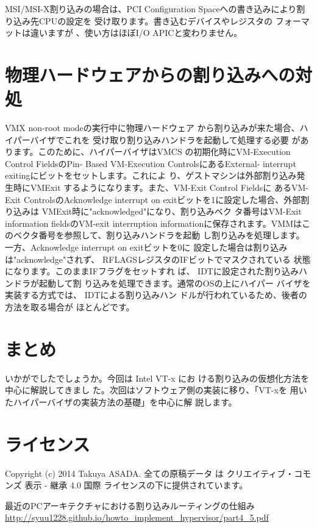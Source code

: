  MSI/MSI-X割り込みの場合は、PCI Configuration
Spaceへの書き込みにより割り込み先CPUの設定を
受け取ります。書き込むデバイスやレジスタの
フォーマットは違いますが 、使い方はほぼI/O
APICと変わりません\cite{interrupt-routing}。

\section{物理ハードウェアからの割り込みへの対処}

 VMX non-root modeの実行中に物理ハードウェア
から割り込みが来た場合、ハイパーバイザでこれを
受け取り割り込みハンドラを起動して処理する必要
があります。このために、ハイパーバイザはVMCS
の初期化時にVM-Execution Control FieldsのPin-
Based VM-Execution ControlsにあるExternal-
interrupt exitingにビットをセットします。これによ
り、ゲストマシンは外部割り込み発生時にVMExit
するようになります。また、VM-Exit Control Fieldsに
あるVM-Exit ControlsのAcknowledge interrupt on
exitビットを1に設定した場合、外部割り込みは
VMExit時に"acknowledged"になり、割り込みベク
タ番号はVM-Exit information fieldsのVM-exit
interruption informationに保存されます。VMMはこ
のベクタ番号を参照して、割り込みハンドラを起動
し割り込みを処理します。
 一方、Acknowledge interrupt on exitビットを0に
設定した場合は割り込みは"acknowledge"されず、
RFLAGSレジスタのIFビットでマスクされている
状態になります。このままIFフラグをセットすれ
ば、 IDTに設定された割り込みハンドラが起動して割
り込みを処理できます。通常のOSの上にハイパー
バイザを実装する方式では、 IDTによる割り込みハン
ドルが行われているため、後者の方法を取る場合が
ほとんどです。


\section{まとめ}

 いかがでしたでしょうか。今回は Intel VT-x にお
ける割り込みの仮想化方法を中心に解説してきまし
た。次回はソフトウェア側の実装に移り、「VT-xを
用いたハイパーバイザの実装方法の基礎」を中心に解
説します。
\section{ライセンス}
Copyright (c) 2014 Takuya ASADA.
全ての原稿データ は クリエイティブ・コモンズ 表示 - 継承 4.0 国際 ライセンスの下に提供されています。

\begin{thebibliography}{4}
   最近のPCアーキテクチャにおける割り込みルーティングの仕組み \url{http://syuu1228.github.io/howto_implement_hypervisor/part4_5.pdf}
\end{thebibliography}


